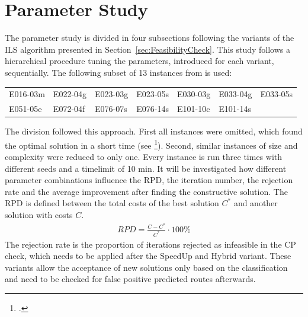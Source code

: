 \section{Parameter Study}
\label{sec:parameter_study}

The parameter study is divided in four subsections following the variants of the \gls{ILS} algorithm
presented in Section~\ref{sec:FeasibilityCheck}. This study follows a hierarchical procedure
tuning the parameters, introduced for each variant, sequentially. The following subset of 13
instances from \gendreauDataSetText is used:


\begin{table}[ht]
	\centering
	\setlength{\tabcolsep}{0.75em}
	\def\arraystretch{1.5}
	\begin{tabular}{lllllll}
		E016-03m & E022-04g & E023-03g & E023-05s & E030-03g & E033-04g & E033-05s \\
		E051-05e & E072-04f & E076-07s & E076-14s & E101-10c & E101-14s &          \\
	\end{tabular}
\end{table}

The division followed this approach. First all instances were omitted, which found
the optimal solution in a short time (see \cite{tamke_branch-and-cut_2024}\footcite[cf.][p. 26]{tamke_branch-and-cut_2024}).
Second, similar instances of size and complexity were reduced to only one.
Every instance is run three times with different seeds and a timelimit of 10 min. It will be investigated
how different parameter combinations influence the \gls{RPD}, the iteration number, the rejection rate and
the average improvement after finding the constructive solution. The \gls{RPD} is defined between the
total costs of the best solution $C^*$ and another solution with costs $C$.
\begin{align}
	RPD = \frac{C - C^*}{C^*} \cdot 100\%
\end{align}
The rejection rate is the proportion of iterations rejected as infeasible in the \gls{CP} check, which needs
to be applied after the SpeedUp and Hybrid  variant. These variants allow the acceptance of
new solutions only based on the classification and need to be checked for false positive predicted routes afterwards.

